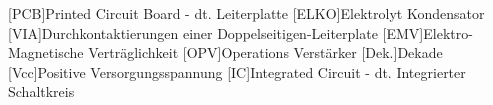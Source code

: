 
\begin{acronym}[ACRONYM]
[PCB]{Printed Circuit Board - dt. Leiterplatte}
[ELKO]{Elektrolyt Kondensator}
[VIA]{Durchkontaktierungen einer Doppelseitigen-Leiterplate}
[EMV]{Elektro-Magnetische Verträglichkeit}
[OPV]{Operations Verstärker}
[Dek.]{Dekade}
[Vcc]{Positive Versorgungsspannung}
[IC]{Integrated Circuit - dt. Integrierter Schaltkreis}


\end{acronym}\newpage

